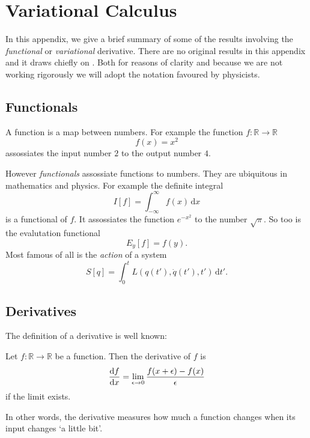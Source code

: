 \chapter{Variational Calculus}
\label{appendix:variational_calculus}

In this appendix, we give a brief summary of some of the results involving the \emph{functional} or \emph{variational} derivative.
There are no original results in this appendix and it draws chiefly on \cite{Lancaster2014}. Both for reasons of clarity and because we are not
working rigorously we will adopt the notation favoured by physicists.

\section{Functionals}
A function is a map between numbers. For example the function $f\colon \mathbb{R} \rightarrow \mathbb{R}$
\begin{equation}
  \label{eq:example_function}
  f(x) = x^2
\end{equation}
assossiates the input number $2$ to the output number $4$.

However \emph{functionals} assossiate functions to numbers. They are ubiquitous in mathematics and physics. For example
the definite integral
\begin{equation}
  \label{eq:example_functional_definite_integral}
  I[f] = \int_{-\infty}^{\infty} f(x) \, \mathrm{d}x
\end{equation}
is a functional of $f$. It assossiates the function $e^{-x^2}$ to the number $\sqrt{\pi}$.
So too is the evalutation functional
\begin{equation}
  \label{eq:example_functional_evaluation}
  E_y[f] = f(y).
\end{equation}
Most famous of all is the \emph{action} of a system
\begin{equation}
  \label{eq:example_functional_action}
  S[q] = \int_0^t L(q(t'),\dot{q}(t'),t')\,\mathrm{d}t'.
\end{equation}

\section{Derivatives}
The definition of a derivative is well known:
\begin{definition}
  \label{definition:derivative}
  Let $f\colon \mathbb{R} \rightarrow \mathbb{R}$ be a function. Then the derivative of $f$ is
  \begin{equation}
    \label{eq:definition_of_derivative}
    \dv{f}{x} = \lim_{\epsilon\rightarrow 0} \frac{f(x + \epsilon) - f(x)}{\epsilon}
  \end{equation}
  if the limit exists.
\end{definition}
In other words, the derivative measures how much a function changes when its input changes `a little bit'.

